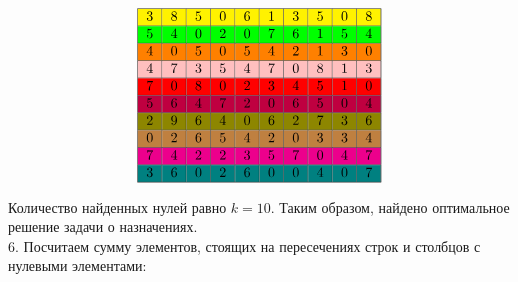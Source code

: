 \documentclass{article}
\begin{document}
\[
    \begin{tabular}{|c|c|c|c|c|c|c|c|c|c|}
        \hline
        \rowcolor{yellow}
        3 & 8 & 5 & 0 & 6 & 1 & 3 & 5 & 0 & 8 \\
        \hline
        \rowcolor{green}
        5 & 4 & 0 & 2 & 0 & 7 & 6 & 1 & 5 & 4 \\
        \hline
        \rowcolor{orange}
        4 & 0 & 5 & 0 & 5 & 4 & 2 & 1 & 3 & 0 \\
        \hline
        \rowcolor{pink}
        4 & 7 & 3 & 5 & 4 & 7 & 0 & 8 & 1 & 3 \\
        \hline
        \rowcolor{red}
        7 & 0 & 8 & 0 & 2 & 3 & 4 & 5 & 1 & 0 \\
        \hline
        \rowcolor{purple}
        5 & 6 & 4 & 7 & 2 & 0 & 6 & 5 & 0 & 4 \\
        \hline
        \rowcolor{olive}
        2 & 9 & 6 & 4 & 0 & 6 & 2 & 7 & 3 & 6 \\
        \hline
        \rowcolor{brown}
        0 & 2 & 6 & 5 & 4 & 2 & 0 & 3 & 3 & 4 \\
        \hline
        \rowcolor{magenta}
        7 & 4 & 2 & 2 & 3 & 5 & 7 & 0 & 4 & 7 \\
        \hline
        \rowcolor{teal}
        3 & 6 & 0 & 2 & 6 & 0 & 0 & 4 & 0 & 7 \\
        \hline
    \end{tabular}
\]

Количество найденных нулей равно $k = 10$. Таким образом, найдено оптимальное решение задачи о назначениях.\\

6. Посчитаем сумму элементов, стоящих на пересечениях строк и столбцов с нулевыми элементами:
\end{document}
